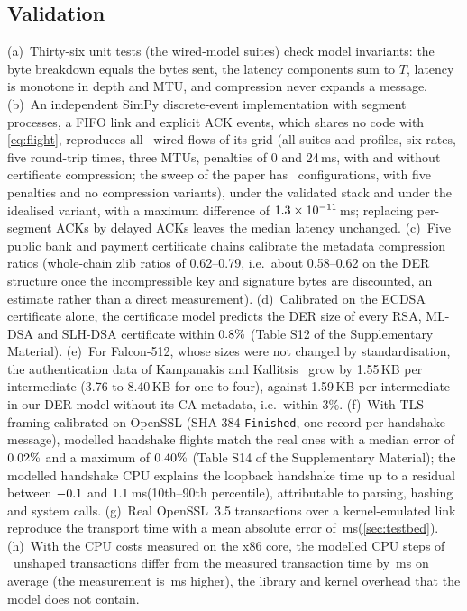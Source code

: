 \documentclass[preprint,12pt]{elsarticle}
\newcommand{\ms}{\,ms\xspace}
\newcommand{\KB}{\,KB\xspace}
\newcommand{\supp}[1]{#1 of the Supplementary Material}
\begin{document}
\subsection{Validation}
(a)~Thirty-six unit tests (the wired-model suites) check model invariants: the byte breakdown equals the bytes sent, the latency components sum to $T$, latency is monotone in depth and MTU, and compression never expands a message. (b)~An independent SimPy discrete-event implementation with segment processes, a FIFO link and explicit ACK events, which shares no code with \cref{eq:flight}, reproduces all \desFlows\ wired flows of its grid (all suites and profiles, six rates, five round-trip times, three MTUs, penalties of 0 and 24\ms, with and without certificate compression; the sweep of the paper has \nConfigs\ configurations, with five penalties and no compression variants), under the validated stack and under the idealised variant, with a maximum difference of $1.3\times10^{-11}$\ms; replacing per-segment ACKs by delayed ACKs leaves the median latency unchanged. (c)~Five public bank and payment certificate chains calibrate the metadata compression ratios (whole-chain zlib ratios of 0.62--0.79, i.e.\ about 0.58--0.62 on the DER structure once the incompressible key and signature bytes are discounted, an estimate rather than a direct measurement). (d)~Calibrated on the ECDSA certificate alone, the certificate model predicts the DER size of every RSA, ML-DSA and SLH-DSA certificate within $0.8\%$ (\supp{Table S12}). (e)~For Falcon-512, whose sizes were not changed by standardisation, the authentication data of Kampanakis and Kallitsis~\cite{kampanakis2022} grow by 1.55\KB per intermediate (3.76 to 8.40\KB for one to four), against 1.59\KB per intermediate in our DER model without its CA metadata, i.e.\ within 3\%. (f)~With TLS framing calibrated on OpenSSL (SHA-384 \texttt{Finished}, one record per handshake message), modelled handshake flights match the real ones with a median error of $0.02\%$ and a maximum of $0.40\%$ (\supp{Table S14}); the modelled handshake CPU explains the loopback handshake time up to a residual between $-0.1$ and $1.1$\ms (10th--90th percentile), attributable to parsing, hashing and system calls. (g)~Real OpenSSL~3.5 transactions over a kernel-emulated link reproduce the transport time with a mean absolute error of \tbMaeStack\ms (\cref{sec:testbed}). (h)~With the CPU costs measured on the x86 core, the modelled CPU steps of \cpuValN\ unshaped transactions differ from the measured transaction time by \cpuValMae\ms on average (the measurement is \cpuValBias\ms higher), the library and kernel overhead that the model does not contain.
\end{document}
